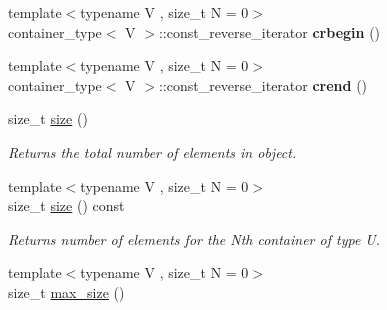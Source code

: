 \begin{DoxyCompactItemize}
\item 
\hypertarget{classheterogeneous_1_1heterovector_3_01_t_01_4_ac1b02fd8b3d1730df34277080ccbc80a}{}{\footnotesize template$<$typename V , size\+\_\+t N = 0$>$ }\\container\+\_\+type$<$ V $>$\+::const\+\_\+reverse\+\_\+iterator {\bfseries crbegin} ()\label{classheterogeneous_1_1heterovector_3_01_t_01_4_ac1b02fd8b3d1730df34277080ccbc80a}

\item 
\hypertarget{classheterogeneous_1_1heterovector_3_01_t_01_4_a4da3fab644a8d47bf5b16d7349fbfe8d}{}{\footnotesize template$<$typename V , size\+\_\+t N = 0$>$ }\\container\+\_\+type$<$ V $>$\+::const\+\_\+reverse\+\_\+iterator {\bfseries crend} ()\label{classheterogeneous_1_1heterovector_3_01_t_01_4_a4da3fab644a8d47bf5b16d7349fbfe8d}

\item 
\hypertarget{classheterogeneous_1_1heterovector_3_01_t_01_4_a41ef7e425b3f1129dd23142891d6fdbb}{}size\+\_\+t \hyperlink{classheterogeneous_1_1heterovector_3_01_t_01_4_a41ef7e425b3f1129dd23142891d6fdbb}{size} ()\label{classheterogeneous_1_1heterovector_3_01_t_01_4_a41ef7e425b3f1129dd23142891d6fdbb}

\begin{DoxyCompactList}\small\item\em Returns the total number of elements in object. \end{DoxyCompactList}\item 
\hypertarget{classheterogeneous_1_1heterovector_3_01_t_01_4_ad8d9c607443999fb4c0eff1abe3c0793}{}{\footnotesize template$<$typename V , size\+\_\+t N = 0$>$ }\\size\+\_\+t \hyperlink{classheterogeneous_1_1heterovector_3_01_t_01_4_ad8d9c607443999fb4c0eff1abe3c0793}{size} () const \label{classheterogeneous_1_1heterovector_3_01_t_01_4_ad8d9c607443999fb4c0eff1abe3c0793}

\begin{DoxyCompactList}\small\item\em Returns number of elements for the Nth container of type U. \end{DoxyCompactList}\item 
\hypertarget{classheterogeneous_1_1heterovector_3_01_t_01_4_a8f12b5ce8b8602bdb1919fd4a2c82cce}{}{\footnotesize template$<$typename V , size\+\_\+t N = 0$>$ }\\size\+\_\+t \hyperlink{classheterogeneous_1_1heterovector_3_01_t_01_4_a8f12b5ce8b8602bdb1919fd4a2c82cce}{max\+\_\+size} ()\label{classheterogeneous_1_1heterovector_3_01_t_01_4_a8f12b5ce8b8602bdb1919fd4a2c82cce}


\end{DoxyCompactItemize}
